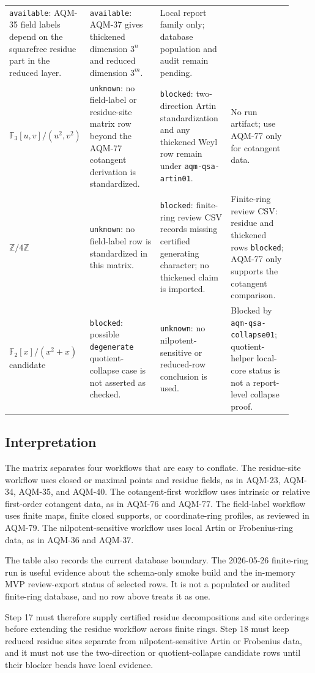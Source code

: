 \begin{center}
\begin{tabular}{p{0.20\linewidth}p{0.25\linewidth}p{0.25\linewidth}p{0.22\linewidth}}
\texttt{available}: AQM-35 field labels depend on the squarefree residue
part in the reduced layer. &
\texttt{available}: AQM-37 gives thickened dimension \(3^n\) and reduced
dimension \(3^m\). &
Local report family only; database population and audit remain pending. \\
\addlinespace
\(\mathbb F_3[u,v]/(u^2,v^2)\) &
\texttt{unknown}: no field-label or residue-site matrix row beyond the
AQM-77 cotangent derivation is standardized. &
\texttt{blocked}: two-direction Artin standardization and any thickened
Weyl row remain under \texttt{aqm-qsa-artin01}. &
No run artifact; use AQM-77 only for cotangent data. \\
\addlinespace
\(\mathbb Z/4\mathbb Z\) &
\texttt{unknown}: no field-label row is standardized in this matrix. &
\texttt{blocked}: finite-ring review CSV records missing certified
generating character; no thickened claim is imported. &
Finite-ring review CSV: residue and thickened rows \texttt{blocked}; AQM-77
only supports the cotangent comparison. \\
\addlinespace
\(\mathbb F_2[x]/(x^2+x)\) candidate &
\texttt{blocked}: possible \texttt{degenerate} quotient-collapse case is not
asserted as checked. &
\texttt{unknown}: no nilpotent-sensitive or reduced-row conclusion is used. &
Blocked by \texttt{aqm-qsa-collapse01}; quotient-helper local-core status is
not a report-level collapse proof. \\
\bottomrule
\end{tabular}
\end{center}

\subsection{Interpretation}

The matrix separates four workflows that are easy to conflate.  The
residue-site workflow uses closed or maximal points and residue fields, as in
AQM-23, AQM-34, AQM-35, and AQM-40.  The cotangent-first workflow uses
intrinsic or relative first-order cotangent data, as in AQM-76 and AQM-77.
The field-label workflow uses finite maps, finite closed supports, or
coordinate-ring profiles, as reviewed in AQM-79.  The nilpotent-sensitive
workflow uses local Artin or Frobenius-ring data, as in AQM-36 and AQM-37.

The table also records the current database boundary.  The 2026-05-26
finite-ring run is useful evidence about the schema-only smoke build and the
in-memory MVP review-export status of selected rows.  It is not a populated
or audited finite-ring database, and no row above treats it as one.

Step 17 must therefore supply certified residue decompositions and site
orderings before extending the residue workflow across finite rings.  Step 18
must keep reduced residue sites separate from nilpotent-sensitive Artin or
Frobenius data, and it must not use the two-direction or quotient-collapse
candidate rows until their blocker beads have local evidence.
